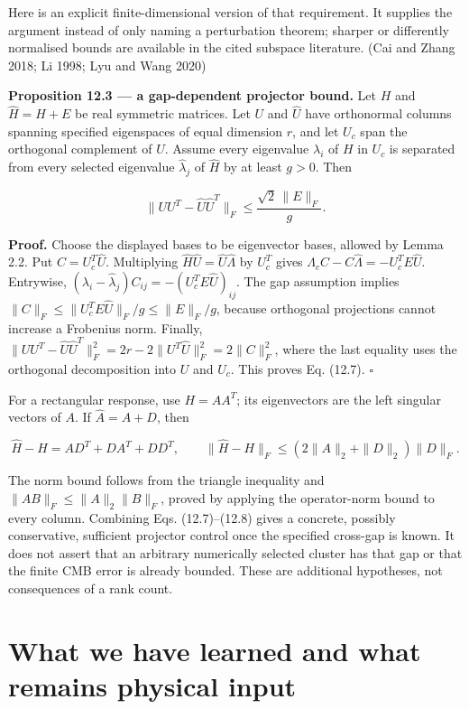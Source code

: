 \documentclass[
  11pt,
  a4paper]{article}
\begin{document}
Here is an explicit finite-dimensional version of that requirement. It supplies the argument instead of only naming a perturbation theorem; sharper or differently normalised bounds are available in the cited subspace literature. (Cai and Zhang 2018; Li 1998; Lyu and Wang 2020)

\textbf{Proposition 12.3 --- a gap-dependent projector bound.} Let \(H\) and \(\widehat H=H+E\) be real symmetric matrices. Let \(U\) and \(\widehat U\) have orthonormal columns spanning specified eigenspaces of equal dimension \(r\), and let \(U_c\) span the orthogonal complement of \(U\). Assume every eigenvalue \(\lambda_i\) of \(H\) in \(U_c\) is separated from every selected eigenvalue \(\widehat\lambda_j\) of \(\widehat H\) by at least \(g>0\). Then

\[
\|UU^T-\widehat U\widehat U^T\|_F
\le\frac{\sqrt2\,\|E\|_F}{g}.
\tag{12.7}
\]

\textbf{Proof.} Choose the displayed bases to be eigenvector bases, allowed by Lemma 2.2. Put \(C=U_c^T\widehat U\). Multiplying \(\widehat H\widehat U=\widehat U\widehat\Lambda\) by \(U_c^T\) gives
\(\Lambda_cC-C\widehat\Lambda=-U_c^TE\widehat U\).
Entrywise,
\((\lambda_i-\widehat\lambda_j)C_{ij}=-(U_c^TE\widehat U)_{ij}\).
The gap assumption implies
\(\|C\|_F\le\|U_c^TE\widehat U\|_F/g\le\|E\|_F/g\),
because orthogonal projections cannot increase a Frobenius norm. Finally,
\(\|UU^T-\widehat U\widehat U^T\|_F^2=2r-2\|U^T\widehat U\|_F^2=2\|C\|_F^2\),
where the last equality uses the orthogonal decomposition into \(U\) and \(U_c\). This proves Eq. (12.7). \(\square\)

For a rectangular response, use \(H=AA^T\); its eigenvectors are the left singular vectors of \(A\). If \(\widehat A=A+D\), then

\[
\widehat H-H=AD^T+DA^T+DD^T,
\qquad
\|\widehat H-H\|_F
\le(2\|A\|_2+\|D\|_2)\|D\|_F.
\tag{12.8}
\]

The norm bound follows from the triangle inequality and \(\|AB\|_F\le\|A\|_2\|B\|_F\), proved by applying the operator-norm bound to every column. Combining Eqs. (12.7)--(12.8) gives a concrete, possibly conservative, sufficient projector control once the specified cross-gap is known. It does not assert that an arbitrary numerically selected cluster has that gap or that the finite CMB error is already bounded. These are additional hypotheses, not consequences of a rank count.

\hypertarget{what-we-have-learned-and-what-remains-physical-input}{%
\section{What we have learned and what remains physical input}\label{what-we-have-learned-and-what-remains-physical-input}}
\end{document}
